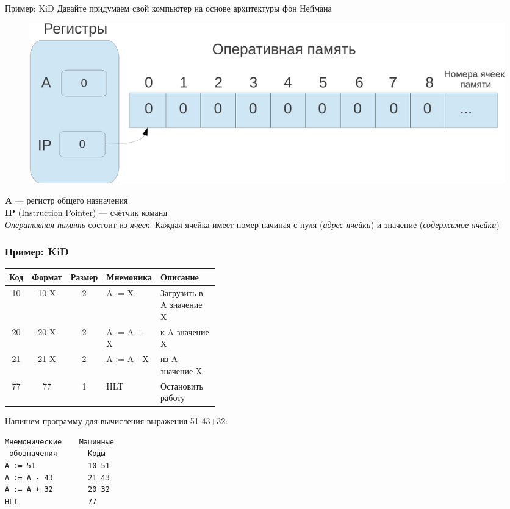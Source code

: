 \documentclass{beamer}
\begin{document}
    \subsection{}
    \begin{frame}{Пример: KiD}
        Давайте придумаем свой компьютер на основе архитектуры фон Неймана
        \begin{figure}
            \includegraphics[width=1.0\linewidth]{fig/KiD.pdf}
        \end{figure}
        {\bf A } --- регистр общего назначения \\
        {\bf IP} (Instruction Pointer) --- счётчик команд \\
        {\it Оперативная память} состоит из {\it ячеек}. Каждая ячейка имеет номер начиная с нуля ({\it адрес ячейки}) и значение ({\it содержимое ячейки})
    \end{frame}
    \begin{frame}[fragile]
        \frametitle{Пример: KiD}
        \begin{tabular}{|c|c|c|l|p{0.4\linewidth}|}
            \hline \bf Код & \bf Формат & \bf Размер & \bf Мнемоника & \bf Описание \\
            \hline 10 & 10 X & 2 & A := X & \small Загрузить в A значение X \\
            \hline 20 & 20 X & 2 & A := A + X &  к A значение X \\
            \hline 21 & 21 X & 2 & A := A - X &  из A значение X \\
            \hline 77 & 77 & 1 & HLT & \small Остановить работу \\
            \hline
        \end{tabular}
        \begin{block}{Напишем программу для вычисления выражения 51-43+32:}
        \begin{verbatim}
Мнемонические    Машинные
 обозначения       Коды
A := 51            10 51
A := A - 43        21 43
A := A + 32        20 32
HLT                77
        \end{verbatim}
        \end{block}
\end{frame}
\end{document}

